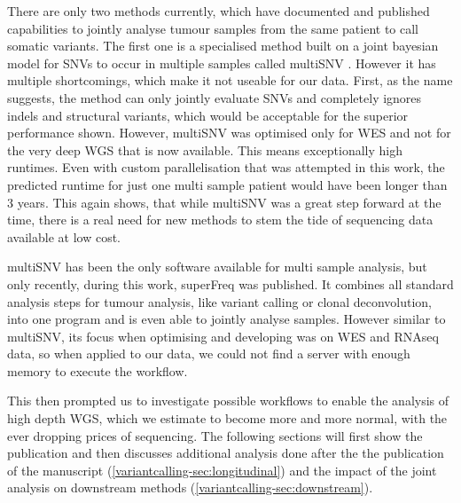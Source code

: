 There are only two methods currently, which have documented and published capabilities to jointly analyse tumour samples from the same patient to call somatic variants. The first one is a specialised method built on a joint bayesian model for SNVs to occur in multiple samples called multiSNV \cite{Josephidou2015}. However it has multiple shortcomings, which make it not useable for our data. First, as the name suggests, the method can only jointly evaluate SNVs and completely ignores indels and structural variants, which would be acceptable for the superior performance shown. However, multiSNV was optimised only for WES and not for the very deep WGS that is now available. This means exceptionally high runtimes. Even with custom parallelisation that was attempted in this work, the predicted runtime for just one multi sample patient would have been longer than 3 years. This again shows, that while multiSNV was a great step forward at the time, there is a real need for new methods to stem the tide of sequencing data available at low cost.

multiSNV has been the only software available for multi sample analysis, but only recently, during this work, superFreq \cite{Flensburg2020} was published. It combines all standard analysis steps for tumour analysis, like variant calling or clonal deconvolution, into one program and is even able to jointly analyse samples. However similar to multiSNV, its focus when optimising and developing was on WES and RNAseq data, so when applied to our data, we could not find a server with enough memory to execute the workflow.

This then prompted us to investigate possible workflows to enable the analysis of high depth WGS, which we estimate to become more and more normal, with the ever dropping prices of sequencing. The following sections will first show the publication and then discusses additional analysis done after the the publication of the manuscript (\autoref{variantcalling-sec:longitudinal}) and the impact of the joint analysis on downstream methods (\autoref{variantcalling-sec:downstream}).

